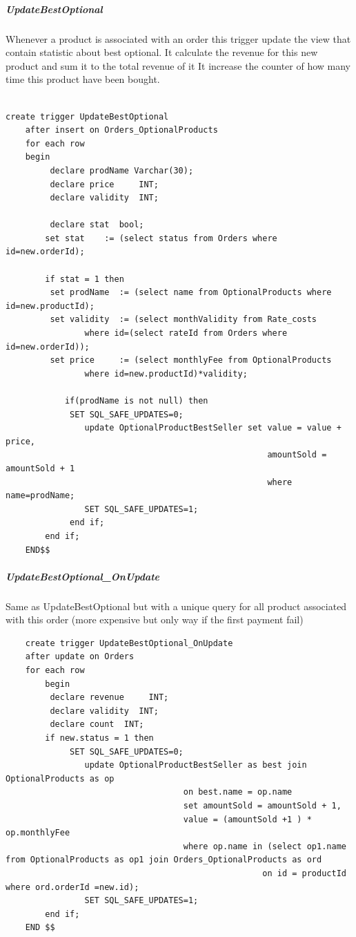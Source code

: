\documentclass{article}
\begin{document}
\subparagraph{UpdateBestOptional}
Whenever a product is associated with an order this trigger update the view that contain statistic about best optional.
It calculate the revenue for this new product and sum it to the total revenue of it
It increase the counter of how many time this product have been bought.
\begin{lstlisting}
    
create trigger UpdateBestOptional
    after insert on Orders_OptionalProducts
	for each row
    begin
		 declare prodName Varchar(30);
         declare price     INT;
         declare validity  INT;
         
         declare stat  bool;
		set stat    := (select status from Orders where id=new.orderId);

		if stat = 1 then
		 set prodName  := (select name from OptionalProducts where id=new.productId);
         set validity  := (select monthValidity from Rate_costs 
         		where id=(select rateId from Orders where id=new.orderId));
		 set price     := (select monthlyFee from OptionalProducts 
		 		where id=new.productId)*validity;
         
			if(prodName is not null) then
			 SET SQL_SAFE_UPDATES=0;    
				update OptionalProductBestSeller set value = value + price,
													 amountSold = amountSold + 1 
													 where name=prodName;
				SET SQL_SAFE_UPDATES=1;    
			 end if;
        end if;
    END$$
\end{lstlisting}

\subparagraph{UpdateBestOptional_OnUpdate}
Same as UpdateBestOptional but with a unique query for all product associated with this order (more expensive but only way if the first payment fail)
\begin{lstlisting}
    create trigger UpdateBestOptional_OnUpdate
	after update on Orders
    for each row
		begin
         declare revenue     INT;
         declare validity  INT;
		 declare count  INT;
		if new.status = 1 then
			 SET SQL_SAFE_UPDATES=0;    
				update OptionalProductBestSeller as best join OptionalProducts as op
									on best.name = op.name
									set amountSold = amountSold + 1,
									value = (amountSold +1 ) * op.monthlyFee
									where op.name in (select op1.name from OptionalProducts as op1 join Orders_OptionalProducts as ord
													on id = productId where ord.orderId =new.id);
				SET SQL_SAFE_UPDATES=1;    
		end if;
	END $$
\end{lstlisting}
\end{document}
